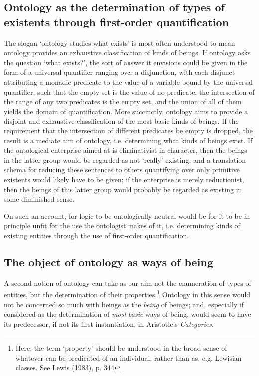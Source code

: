 \documentclass[]{article}
\begin{document}
\subsection{Ontology as the determination of types of existents through first-order quantification}
The slogan `ontology studies what exists' is most often understood to mean ontology provides an exhaustive classification of kinds of beings. If ontology asks the question `what exists?', the sort of answer it envisions could be given in the form of a universal quantifier ranging over a disjunction, with each disjunct attributing a monadic predicate to the value of a variable bound by the universal quantifier, such that the empty set is the value of no predicate, the intersection of the range of any two predicates is the empty set, and the union of all of them yields the domain of quantification. More succinctly, ontology aims to provide a disjoint and exhaustive classification of the most basic kinds of beings. If the requirement that the intersection of different predicates be empty is dropped, the result is a mediate aim of ontology, i.e. determining what kinds of beings exist. If the ontological enterprise aimed at is eliminativist in character, then the beings in the latter group would be regarded as not `really' existing, and a translation schema for reducing these sentences to others quantifying over only primitive existents would likely have to be given; if the enterprise is merely reductionist, then the beings of this latter group would probably be regarded as existing in some diminished sense.

On such an account, for logic to be ontologically neutral would be for it to be in principle unfit for the use the ontologist makes of it, i.e. determining kinds of existing entities through the use of first-order quantification.

\subsection{The object of ontology as ways of being}

A second notion of ontology can take as our aim not the enumeration of types of entities, but the determination of their properties.\footnote{Here, the term `property' should be understood in the broad sense of whatever can be predicated of an individual, rather than as, e.g. Lewisian classes. See Lewis (1983), p. 344} Ontology in this sense would not be concerned so much with beings as the \textit{being} of beings; and, especially if considered as the determination of \textit{most basic} ways of being, would seem to have its predecessor, if not its first instantiation, in Aristotle's \textit{Categories}.
\end{document}
